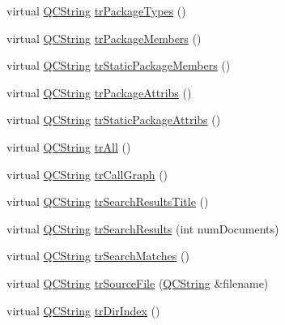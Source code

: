 \begin{DoxyCompactItemize}
\item 
virtual \mbox{\hyperlink{class_q_c_string}{Q\+C\+String}} \mbox{\hyperlink{class_translator_italian_a13ae8892c89793d11fcc84ac907a1df2}{tr\+Package\+Types}} ()
\item 
virtual \mbox{\hyperlink{class_q_c_string}{Q\+C\+String}} \mbox{\hyperlink{class_translator_italian_a69898e659d6832ecf26184e01bd68aa9}{tr\+Package\+Members}} ()
\item 
virtual \mbox{\hyperlink{class_q_c_string}{Q\+C\+String}} \mbox{\hyperlink{class_translator_italian_a858344d24e5de4a7681e508e8b877384}{tr\+Static\+Package\+Members}} ()
\item 
virtual \mbox{\hyperlink{class_q_c_string}{Q\+C\+String}} \mbox{\hyperlink{class_translator_italian_a1efcbd6860cdfef389776a1fa84c4bd9}{tr\+Package\+Attribs}} ()
\item 
virtual \mbox{\hyperlink{class_q_c_string}{Q\+C\+String}} \mbox{\hyperlink{class_translator_italian_a0cbd073783f6e8c1e335e4b9b73e77e5}{tr\+Static\+Package\+Attribs}} ()
\item 
virtual \mbox{\hyperlink{class_q_c_string}{Q\+C\+String}} \mbox{\hyperlink{class_translator_italian_a2042276baccefc301d0f372baa2789d6}{tr\+All}} ()
\item 
virtual \mbox{\hyperlink{class_q_c_string}{Q\+C\+String}} \mbox{\hyperlink{class_translator_italian_a20cf1b2dc9f92f8d66149ce672b277d6}{tr\+Call\+Graph}} ()
\item 
virtual \mbox{\hyperlink{class_q_c_string}{Q\+C\+String}} \mbox{\hyperlink{class_translator_italian_a00cba20573d3f37349e23993fc1c689b}{tr\+Search\+Results\+Title}} ()
\item 
virtual \mbox{\hyperlink{class_q_c_string}{Q\+C\+String}} \mbox{\hyperlink{class_translator_italian_a0c2b002675a15343c8cf5eb23b644e3a}{tr\+Search\+Results}} (int num\+Documents)
\item 
virtual \mbox{\hyperlink{class_q_c_string}{Q\+C\+String}} \mbox{\hyperlink{class_translator_italian_adb2d1bc1a5ebcd81bdf45c6a32830d21}{tr\+Search\+Matches}} ()
\item 
virtual \mbox{\hyperlink{class_q_c_string}{Q\+C\+String}} \mbox{\hyperlink{class_translator_italian_aff84143ff9de089e1bda981fb2006c28}{tr\+Source\+File}} (\mbox{\hyperlink{class_q_c_string}{Q\+C\+String}} \&filename)
\item 
virtual \mbox{\hyperlink{class_q_c_string}{Q\+C\+String}} \mbox{\hyperlink{class_translator_italian_adfc5d01cf997c3c181d84b45f7ad9e45}{tr\+Dir\+Index}} ()
\item 

\end{DoxyCompactItemize}
